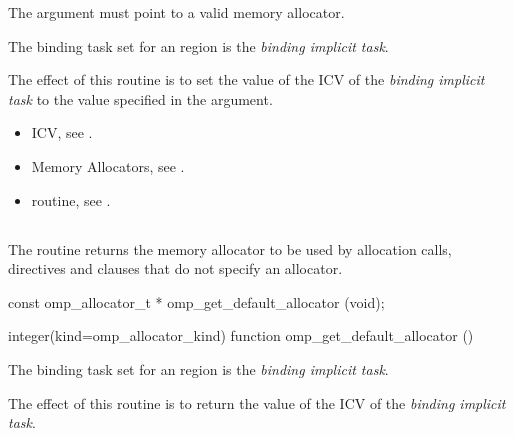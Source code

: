 \constraints

The  argument must point to a valid memory allocator.

\binding
The binding task set for an  region is the \emph{binding implicit task}.

\effect

The effect of this routine is to set the value of the  ICV of the \emph{binding implicit task} to the value specified in the  argument. 

\crossreferences

\begin{itemize}
\item {} ICV, see .
\item Memory Allocators, see .
\item {} routine, see .
\end{itemize}

\subsection{}
\label{subsec:omp_get_default_allocator}

\summary
The  routine returns the memory allocator to be used by allocation calls,  directives and  clauses that do not specify an allocator.

\format
\ccppspecificstart
\begin{ompcFunction}
const omp_allocator_t * omp_get_default_allocator (void);
\end{ompcFunction}
\ccppspecificend
\fortranspecificstart
\begin{ompfFunction}
integer(kind=omp_allocator_kind)
function omp_get_default_allocator ()
\end{ompfFunction}
\fortranspecificend

\binding

The binding task set for an  region is the \emph{binding implicit task}.

\effect

The effect of this routine is to return the value of the  ICV of the \emph{binding implicit task}.


